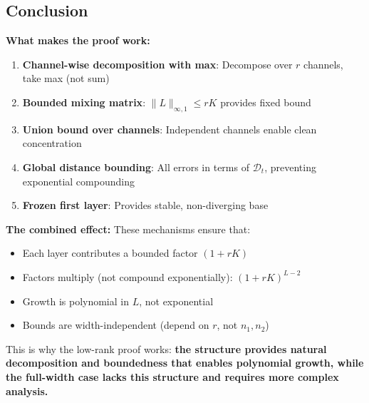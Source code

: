 \subsection{Conclusion}

\textbf{What makes the proof work:}

\begin{enumerate}
\item \textbf{Channel-wise decomposition with max}: Decompose over $r$ channels, take max (not sum)
\item \textbf{Bounded mixing matrix}: $\|L\|_{\infty,1} \le rK$ provides fixed bound
\item \textbf{Union bound over channels}: Independent channels enable clean concentration
\item \textbf{Global distance bounding}: All errors in terms of $\mathscr{D}_t$, preventing exponential compounding
\item \textbf{Frozen first layer}: Provides stable, non-diverging base
\end{enumerate}

\textbf{The combined effect:} These mechanisms ensure that:
\begin{itemize}
\item Each layer contributes a bounded factor $(1+rK)$
\item Factors multiply (not compound exponentially): $(1+rK)^{L-2}$
\item Growth is polynomial in $L$, not exponential
\item Bounds are width-independent (depend on $r$, not $n_1, n_2$)
\end{itemize}

This is why the low-rank proof works: \textbf{the structure provides natural decomposition and boundedness that enables polynomial growth, while the full-width case lacks this structure and requires more complex analysis.}
